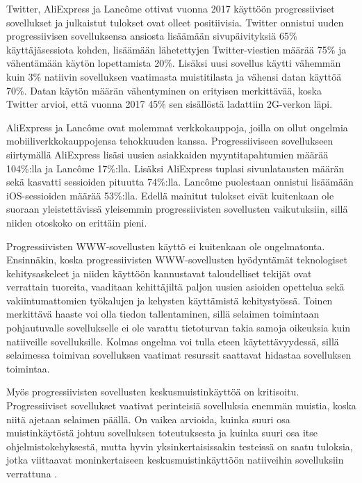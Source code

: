 \documentclass[utf8]{gradu3}
\begin{document}
Twitter, AliExpress ja Lancôme ottivat vuonna 2017 käyttöön progressiiviset sovellukset ja julkaistut tulokset ovat olleet positiivisia. Twitter onnistui uuden progressiivisen sovelluksensa ansiosta lisäämään sivupäivityksiä 65\% käyttäjäsessiota kohden, lisäämään lähetettyjen Twitter-viestien määrää 75\% ja vähentämään käytön lopettamista 20\%. Lisäksi uusi sovellus käytti vähemmän kuin 3\% natiivin sovelluksen vaatimasta muistitilasta ja vähensi datan käyttöä 70\%. Datan käytön määrän vähentyminen on erityisen merkittävää, koska Twitter arvioi, että vuonna 2017 45\% sen sisällöstä ladattiin 2G-verkon läpi. \parencite[]{beginners-guide-pwa}

AliExpress ja Lancôme ovat molemmat verkkokauppoja, joilla on ollut ongelmia mobiiliverkkokauppojensa tehokkuuden kanssa. Progressiiviseen sovellukseen siirtymällä AliExpress lisäsi uusien asiakkaiden myyntitapahtumien määrää 104\%:lla ja Lancôme 17\%:lla. Lisäksi AliExpress tuplasi sivunlatausten määrän sekä kasvatti sessioiden pituutta 74\%:lla. Lancôme puolestaan onnistui lisäämään iOS-sessioiden määrää 53\%:lla. Edellä mainitut tulokset eivät kuitenkaan ole suoraan yleistettävissä yleisemmin progressiivisten sovellusten vaikutuksiin, sillä niiden otoskoko on erittäin pieni. \parencite[]{beginners-guide-pwa}

Progressiivisten WWW-sovellusten käyttö ei kuitenkaan ole ongelmatonta. Ensinnäkin, koska progressiivisten WWW-sovellusten hyödyntämät teknologiset kehitysaskeleet ja niiden käyttöön kannustavat taloudelliset tekijät ovat verrattain tuoreita, vaaditaan kehittäjiltä paljon uusien asioiden opettelua sekä vakiintumattomien työkalujen ja kehysten käyttämistä kehitystyössä. Toinen merkittävä haaste voi olla tiedon tallentaminen, sillä selaimen toimintaan pohjautuvalle sovellukselle ei ole varattu tietoturvan takia samoja oikeuksia kuin natiiveille sovelluksille. Kolmas ongelma voi tulla eteen käytettävyydessä, sillä selaimessa toimivan sovelluksen vaatimat resurssit saattavat hidastaa sovelluksen toimintaa. \parencite[]{pwa-design-challenges}

Myös progressiivisten sovellusten keskusmuistinkäyttöä on kritisoitu. Progressiiviset sovellukset vaativat perinteisiä sovelluksia enemmän muistia, koska niitä ajetaan selaimen päällä. On vaikea arvioida, kuinka suuri osa muistinkäytöstä johtuu sovelluksen toteutuksesta ja kuinka suuri osa itse ohjelmistokehyksestä, mutta hyvin yksinkertaisissakin testeissä on saatu tuloksia, jotka viittaavat moninkertaiseen keskusmuistinkäyttöön natiiveihin sovelluksiin verrattuna \parencite[]{electron-memory-usage}.
\end{document}
